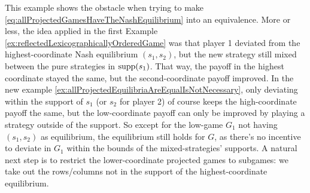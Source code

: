 \documentclass[a4paper]{scrreprt}
\begin{document}
    This example shows the obstacle when trying to make \eqref{eq:allProjectedGamesHaveTheNashEquilibrium} into an equivalence.
    More or less, the idea applied in the first Example \ref{ex:reflectedLexicographicallyOrderedGame} was that player 1 deviated from the highest-coordinate Nash equilibrium $(s_1, s_2)$, but the new strategy still mixed between the pure strategies in $\operatorname{supp}(s_1)$. That way, the payoff in the highest coordinate stayed the same, but the second-coordinate payoff improved.
    In the new example \ref{ex:allProjectedEquilibriaAreEqualIsNotNecessary}, only deviating within the support of $s_1$ (or $s_2$ for player 2) of course keeps the high-coordinate payoff the same, but the low-coordinate payoff can only be improved by playing a strategy outside of the support.
    So except for the low-game $G_1$ not having $(s_1, s_2)$ as equilibrium, the equilibrium still holds for $G$, as there's no incentive to deviate in $G_1$ within the bounds of the mixed-strategies' supports.
    A natural next step is to restrict the lower-coordinate projected games to subgames: we take out the rows/columns not in the support of the highest-coordinate equilibrium.
    
\end{document}
